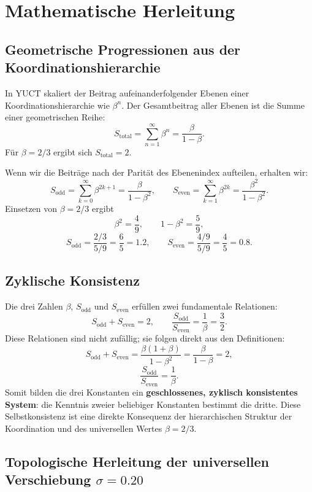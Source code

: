 \documentclass[12pt,a4paper]{article}
\begin{document}
	\section{Mathematische Herleitung}
	
	\subsection{Geometrische Progressionen aus der Koordinationshierarchie}
	In YUCT skaliert der Beitrag aufeinanderfolgender Ebenen einer Koordinationshierarchie wie \(\beta^n\). Der Gesamtbeitrag aller Ebenen ist die Summe einer geometrischen Reihe:
	\[
	S_{\text{total}} = \sum_{n=1}^{\infty} \beta^n = \frac{\beta}{1-\beta}.
	\]
	Für \(\beta = 2/3\) ergibt sich \(S_{\text{total}} = 2\).
	
	Wenn wir die Beiträge nach der Parität des Ebenenindex aufteilen, erhalten wir:
	\[
	S_{\text{odd}} = \sum_{k=0}^{\infty} \beta^{2k+1} = \frac{\beta}{1-\beta^2},
	\qquad
	S_{\text{even}} = \sum_{k=1}^{\infty} \beta^{2k} = \frac{\beta^2}{1-\beta^2}.
	\]
	Einsetzen von \(\beta = 2/3\) ergibt
	\[
	\beta^2 = \frac{4}{9},\qquad 1-\beta^2 = \frac{5}{9},
	\]
	\[
	S_{\text{odd}} = \frac{2/3}{5/9} = \frac{6}{5}=1.2,\qquad
	S_{\text{even}} = \frac{4/9}{5/9} = \frac{4}{5}=0.8.
	\]
	
	\subsection{Zyklische Konsistenz}
	Die drei Zahlen \(\beta\), \(S_{\text{odd}}\) und \(S_{\text{even}}\) erfüllen zwei fundamentale Relationen:
	\[
	S_{\text{odd}} + S_{\text{even}} = 2,\qquad
	\frac{S_{\text{odd}}}{S_{\text{even}}} = \frac{1}{\beta} = \frac{3}{2}.
	\]
	Diese Relationen sind nicht zufällig; sie folgen direkt aus den Definitionen:
	\[
	S_{\text{odd}} + S_{\text{even}} = \frac{\beta(1+\beta)}{1-\beta^2} = \frac{\beta}{1-\beta}=2,
	\]
	\[
	\frac{S_{\text{odd}}}{S_{\text{even}}} = \frac{1}{\beta}.
	\]
	Somit bilden die drei Konstanten ein \textbf{geschlossenes, zyklisch konsistentes System}: die Kenntnis zweier beliebiger Konstanten bestimmt die dritte. Diese Selbstkonsistenz ist eine direkte Konsequenz der hierarchischen Struktur der Koordination und des universellen Wertes \(\beta=2/3\).
	
	\subsection{Topologische Herleitung der universellen Verschiebung \(\sigma = 0.20\)}
	\label{sec:sigma_topology}
	
\end{document}

